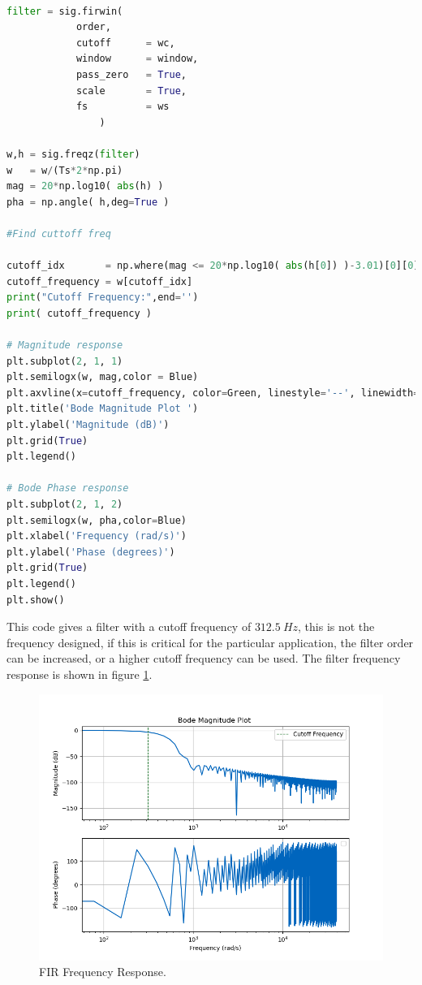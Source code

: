 \vspace{1cm}
\label{list:FirDesign}
\begin{lstlisting}[language=python, caption = Specification Definition]

filter = sig.firwin(
            order,
            cutoff      = wc, 
            window      = window, 
            pass_zero   = True, 
            scale       = True,
            fs          = ws
                )

w,h = sig.freqz(filter)
w   = w/(Ts*2*np.pi)
mag = 20*np.log10( abs(h) )
pha = np.angle( h,deg=True )   

#Find cuttoff freq

cutoff_idx       = np.where(mag <= 20*np.log10( abs(h[0]) )-3.01)[0][0]
cutoff_frequency = w[cutoff_idx]
print("Cutoff Frequency:",end='')
print( cutoff_frequency )

# Magnitude response
plt.subplot(2, 1, 1)
plt.semilogx(w, mag,color = Blue)
plt.axvline(x=cutoff_frequency, color=Green, linestyle='--', linewidth=1,label="Cutoff Frequency")
plt.title('Bode Magnitude Plot ')
plt.ylabel('Magnitude (dB)')
plt.grid(True)
plt.legend()

# Bode Phase response
plt.subplot(2, 1, 2)
plt.semilogx(w, pha,color=Blue)
plt.xlabel('Frequency (rad/s)')
plt.ylabel('Phase (degrees)')
plt.grid(True)
plt.legend()
plt.show()
\end{lstlisting}

This code gives a filter with a cutoff frequency of $312.5~Hz$, this is not the frequency designed, if this is critical for the particular application, the filter order can be increased, or a higher cutoff frequency can be used. The filter frequency response is shown in figure \ref{fig:FIRBode}.

\begin{figure}[H]
    \centering
    \includegraphics*[scale = 0.5]{Images/FIRBode.png}
    \caption{FIR Frequency Response.}
    \label{fig:FIRBode}
\end{figure}

